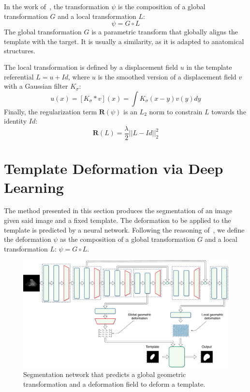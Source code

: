 In the work of~\textcite{mory2012MICCAI}, the transformation $\psi$ is the composition of a global transformation $G$ and a local transformation $L$:
\begin{equation}
    \psi = G \circ L
\end{equation}
The global transformation $G$ is a parametric transform that globally aligns the template with the target. It is usually a similarity, as it is adapted to anatomical structures.

The local transformation is defined by a displacement field $u$ in the template referential $L = u + Id$, where $u$ is the  smoothed version of a displacement field $v$ with a Gaussian filter $K_{\sigma}$:
\begin{equation}
    u(x) = [K_{\sigma} * v](x) = \int K_{\sigma}(x-y)v(y)dy
\end{equation}
Finally, the regularization term $\mathbf{R} \left( \psi \right)$ is an $L_2$ norm to constrain $L$ towards the identity $Id$:
\begin{equation}
    \mathbf{R} \left( L \right) = \frac{\lambda}{2} || L - Id ||^2_2
\end{equation}

\section{Template Deformation via Deep Learning}
\label{sec:deformable_dl}

The method presented in this section produces the segmentation of an image given said image and a fixed template. The deformation to be applied to the template is predicted by a neural network. Following the reasoning of~\textcite{mory2012MICCAI}, we define the deformation $\psi$ as the composition of a global transformation $G$ and a local transformation $L$: $\psi = G \circ L$.

\begin{figure}[htbp]
	\includegraphics[width=\textwidth]{img_seg/deformation_network}
    \caption{Segmentation network that predicts a global geometric transformation and a deformation field to deform a template.}
    \label{fig:deform_network}
\end{figure}

